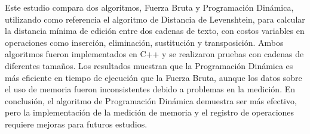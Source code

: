 Este estudio compara dos algoritmos, Fuerza Bruta y Programación Dinámica, utilizando como referencia el algoritmo de Distancia de Levenshtein, para calcular la distancia mínima de edición entre dos cadenas de texto, con costos variables en operaciones como inserción, eliminación, sustitución y transposición. Ambos algoritmos fueron implementados en C++ y se realizaron pruebas con cadenas de diferentes tamaños. Los resultados muestran que la Programación Dinámica es más eficiente en tiempo de ejecución que la Fuerza Bruta, aunque los datos sobre el uso de memoria fueron inconsistentes debido a problemas en la medición. En conclusión, el algoritmo de Programación Dinámica demuestra ser más efectivo, pero la implementación de la medición de memoria y el registro de operaciones requiere mejoras para futuros estudios.



